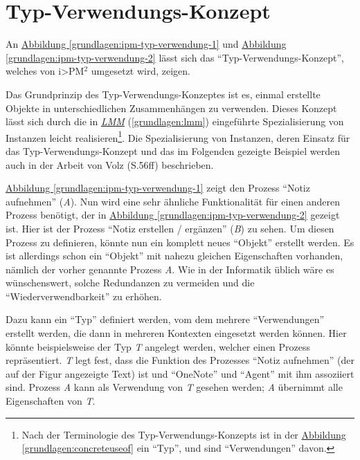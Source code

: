 \documentclass[a4paper,10pt]{sphinxmanual}
\begin{document}
\section{Typ-Verwendungs-Konzept}
\label{grundlagen:typ-verwendungs-konzept}\label{grundlagen:tvk}
An \hyperref[grundlagen:ipm-typ-verwendung-1]{Abbildung  \ref*{grundlagen:ipm-typ-verwendung-1}} und \hyperref[grundlagen:ipm-typ-verwendung-2]{Abbildung  \ref*{grundlagen:ipm-typ-verwendung-2}} lässt sich das "`Typ-Verwendungs-Konzept"', welches von i\textgreater{}PM$^{\text{2}}$ umgesetzt wird, zeigen.

Das Grundprinzip des Typ-Verwendungs-Konzeptes ist es, einmal erstellte Objekte in unterschiedlichen Zusammenhängen zu verwenden.
Dieses Konzept lässt sich durch die in {\hyperref[grundlagen:lmm]{\emph{LMM}}} (\autoref*{grundlagen:lmm}) eingeführte Spezialisierung von Instanzen leicht realisieren\footnote{
Nach der Terminologie des Typ-Verwendungs-Konzepts ist in der \hyperref[grundlagen:concreteuseof]{Abbildung  \ref*{grundlagen:concreteuseof}}  ein "`Typ"',  und  sind "`Verwendungen"' davon.
}.
Die Spezialisierung von Instanzen, deren Einsatz für das Typ-Verwendungs-Konzept und das im Folgenden gezeigte Beispiel werden auch in der Arbeit von Volz \cite{volz_werkzeugunterstutzung_2011} (S.56ff) beschrieben.

\hyperref[grundlagen:ipm-typ-verwendung-1]{Abbildung  \ref*{grundlagen:ipm-typ-verwendung-1}} zeigt den Prozess "`Notiz aufnehmen"' (\emph{A}).
Nun wird eine sehr ähnliche Funktionalität für einen anderen Prozess benötigt, der in \hyperref[grundlagen:ipm-typ-verwendung-2]{Abbildung  \ref*{grundlagen:ipm-typ-verwendung-2}} gezeigt ist.
Hier ist der Prozess "`Notiz erstellen / ergänzen"' (\emph{B}) zu sehen.
Um diesen Prozess zu definieren, könnte nun ein komplett neues "`Objekt"' erstellt werden.
Es ist allerdings schon ein "`Objekt"' mit nahezu gleichen Eigenschaften vorhanden, nämlich der vorher genannte Prozess \emph{A}.
Wie in der Informatik üblich wäre es wünschenswert, solche Redundanzen zu vermeiden und die "`Wiederverwendbarkeit"' zu erhöhen.

Dazu kann ein "`Typ"' definiert werden, vom dem mehrere "`Verwendungen"' erstellt werden, die dann in mehreren Kontexten eingesetzt werden können.
Hier könnte beispielsweise der Typ \emph{T} angelegt werden, welcher einen Prozess repräsentiert.
\emph{T} legt fest, dass die Funktion des Prozesses "`Notiz aufnehmen"' (der auf der Figur angezeigte Text) ist und "`OneNote"' und "`Agent"' mit ihm assoziiert sind.
Prozess \emph{A} kann als Verwendung von \emph{T} gesehen werden; \emph{A} übernimmt alle Eigenschaften von \emph{T}.
\end{document}
